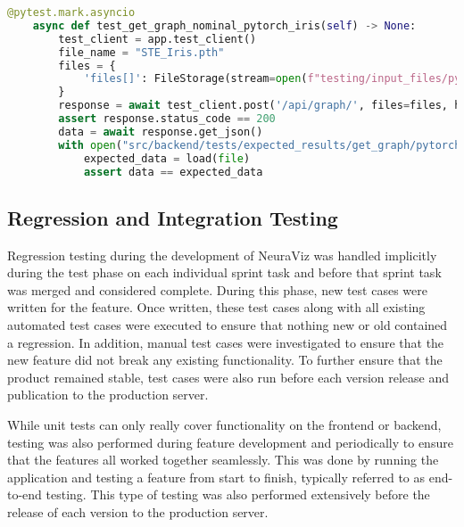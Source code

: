 \begin{center}
    \begin{lstlisting}[language=Python, float=*htb, caption={Pytest Test Case Example}, label={lst:pytest-example}]
    @pytest.mark.asyncio
    async def test_get_graph_nominal_pytorch_iris(self) -> None:
        test_client = app.test_client()
        file_name = "STE_Iris.pth"
        files = {
            'files[]': FileStorage(stream=open(f"testing/input_files/pytorch/{file_name}", 'rb'), filename=file_name)
        }
        response = await test_client.post('/api/graph/', files=files, headers={'Content-Type': 'multipart/form-data'})
        assert response.status_code == 200
        data = await response.get_json()
        with open("src/backend/tests/expected_results/get_graph/pytorch/nominal_STE_Iris.json", 'r') as file:
            expected_data = load(file)
            assert data == expected_data
    \end{lstlisting}
\end{center}

\subsection{Regression and Integration Testing}
Regression testing during the development of NeuraViz was handled implicitly during the test phase on each individual sprint task and before that sprint task was merged and considered complete. During this phase, new test cases were written for the feature. Once written, these test cases along with all existing automated test cases were executed to ensure that nothing new or old contained a regression. In addition, manual test cases were investigated to ensure that the new feature did not break any existing functionality. To further ensure that the product remained stable, test cases were also run before each version release and publication to the production server.  

While unit tests can only really cover functionality on the frontend or backend, testing was also performed during feature development and periodically to ensure that the features all worked together seamlessly. This was done by running the application and testing a feature from start to finish, typically referred to as end-to-end testing. This type of testing was also performed extensively before the release of each version to the production server.